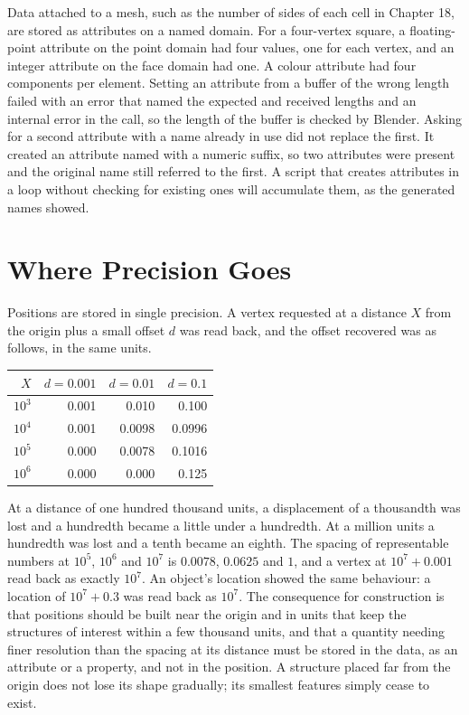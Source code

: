 Data attached to a mesh, such as the number of sides of each cell in Chapter 18, are stored as attributes on a named domain. For a four-vertex square, a floating-point attribute on the point domain had four values, one for each vertex, and an integer attribute on the face domain had one. A colour attribute had four components per element. Setting an attribute from a buffer of the wrong length failed with an error that named the expected and received lengths and an internal error in the call, so the length of the buffer is checked by Blender. Asking for a second attribute with a name already in use did not replace the first. It created an attribute named with a numeric suffix, so two attributes were present and the original name still referred to the first. A script that creates attributes in a loop without checking for existing ones will accumulate them, as the generated names showed.

\section{Where Precision Goes}

Positions are stored in single precision. A vertex requested at a distance $X$ from the origin plus a small offset $d$ was read back, and the offset recovered was as follows, in the same units.

\begin{center}
\begin{tabular}{rrrr}
\toprule
$X$ & $d=0.001$ & $d=0.01$ & $d=0.1$\\
\midrule
$10^{3}$ & 0.001 & 0.010 & 0.100\\
$10^{4}$ & 0.001 & 0.0098 & 0.0996\\
$10^{5}$ & 0.000 & 0.0078 & 0.1016\\
$10^{6}$ & 0.000 & 0.000 & 0.125\\
\bottomrule
\end{tabular}
\end{center}

At a distance of one hundred thousand units, a displacement of a thousandth was lost and a hundredth became a little under a hundredth. At a million units a hundredth was lost and a tenth became an eighth. The spacing of representable numbers at $10^5$, $10^6$ and $10^7$ is $0.0078$, $0.0625$ and $1$, and a vertex at $10^7+0.001$ read back as exactly $10^7$. An object's location showed the same behaviour: a location of $10^7+0.3$ was read back as $10^7$. The consequence for construction is that positions should be built near the origin and in units that keep the structures of interest within a few thousand units, and that a quantity needing finer resolution than the spacing at its distance must be stored in the data, as an attribute or a property, and not in the position. A structure placed far from the origin does not lose its shape gradually; its smallest features simply cease to exist.

